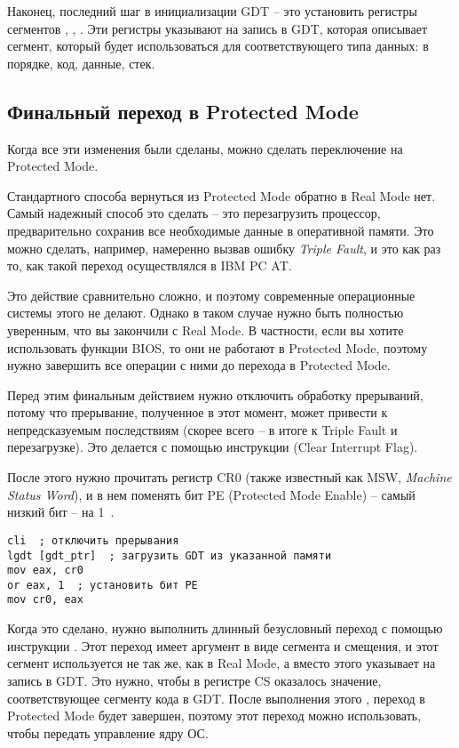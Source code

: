 \documentclass[a4page]{article}
\begin{document}
Наконец, последний шаг в инициализации GDT -- это установить регистры сегментов , , .
Эти регистры указывают на запись в GDT, которая описывает сегмент, который будет использоваться для соответствующего типа данных:
в порядке, код, данные, стек.

\subsection{Финальный переход в Protected Mode}

Когда все эти изменения были сделаны, можно сделать переключение на Protected Mode.

Стандартного способа вернуться из Protected Mode обратно в Real Mode нет.
Самый надежный способ это сделать -- это перезагрузить процессор,
предварительно сохранив все необходимые данные в оперативной памяти.
Это можно сделать, например, намеренно вызвав ошибку \emph{Triple Fault},
и это как раз то, как такой переход осуществлялся в IBM PC AT.

Это действие сравнительно сложно, и поэтому современные операционные системы этого не делают.
Однако в таком случае нужно быть полностью уверенным, что вы закончили с Real Mode.
В частности, если вы хотите использовать функции BIOS, то они не работают в Protected Mode,
поэтому нужно завершить все операции с ними до перехода в Protected Mode.

Перед этим финальным действием нужно отключить обработку прерываний, потому что прерывание, полученное в этот момент,
может привести к непредсказуемым последствиям (скорее всего -- в итоге к Triple Fault и перезагрузке).
Это делается с помощью инструкции  (Clear Interrupt Flag).

После этого нужно прочитать регистр CR0 (также известный как MSW, \emph{Machine Status Word}),
и в нем поменять бит PE (Protected Mode Enable) -- самый низкий бит -- на 1~\cite{osdev:protected}.

\begin{verbatim}
cli  ; отключить прерывания
lgdt [gdt_ptr]  ; загрузить GDT из указанной памяти
mov eax, cr0
or eax, 1  ; установить бит PE
mov cr0, eax
\end{verbatim}


Когда это сделано, нужно выполнить длинный безусловный переход с помощью инструкции .
Этот переход имеет аргумент в виде сегмента и смещения, и
этот сегмент используется не так же, как в Real Mode, а вместо этого указывает на запись в GDT.
Это нужно, чтобы в регистре CS оказалось значение, соответствующее сегменту кода в GDT.
После выполнения этого , переход в Protected Mode будет завершен,
поэтому этот переход можно использовать, чтобы передать управление ядру ОС.
\end{document}
